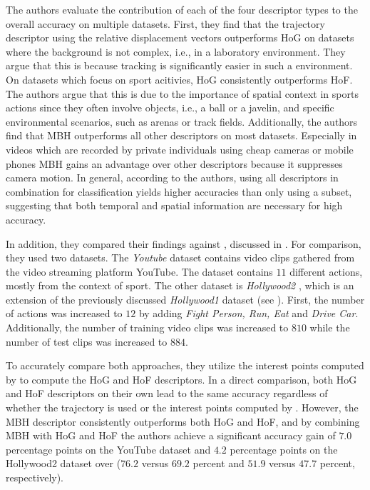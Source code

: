 The authors evaluate the contribution of each of the four descriptor types to the overall accuracy on multiple datasets.
First, they find that the trajectory descriptor using the relative displacement vectors outperforms HoG on datasets where the background is not complex, i.e., in a laboratory environment.
They argue that this is because tracking is significantly easier in such a environment.
On datasets which focus on sport acitivies, HoG consistently outperforms HoF.
The authors argue that this is due to the importance of spatial context in sports actions since they often involve objects, i.e., a ball or a javelin, and specific environmental scenarios, such as arenas or track fields.
Additionally, the authors find that MBH outperforms all other descriptors on most datasets.
Especially in videos which are recorded by private individuals using cheap cameras or mobile phones MBH gains an advantage over other descriptors because it suppresses camera motion.
In general, according to the authors, using all descriptors in combination for classification yields higher accuracies than only using a subset, suggesting that both temporal and spatial information are necessary for high accuracy.

In addition, they compared their findings against \cite{laptev_learning_2008}, discussed in .
For comparison, they used two datasets.
The \textit{Youtube} dataset \cite{liu_recognizing_2009} contains video clips gathered from the video streaming platform YouTube.
The dataset contains $11$ different actions, mostly from the context of sport.
The other dataset is \textit{Hollywood2} \cite{marszalek_actions_2009}, which is an extension of the previously discussed \textit{Hollywood1} dataset \cite{laptev_learning_2008} (see ).
First, the number of actions was increased to $12$ by adding \textit{Fight Person, Run, Eat} and \textit{Drive Car}.
Additionally, the number of training video clips was increased to $810$ while the number of test clips was increased to $884$. 

To accurately compare both approaches, they utilize the interest points computed by \cite{laptev_learning_2008} to compute the HoG and HoF descriptors.
In a direct comparison, both HoG and HoF descriptors on their own lead to the same accuracy regardless of whether the trajectory is used or the interest points computed by \cite{laptev_learning_2008}.
However, the MBH descriptor consistently outperforms both HoG and HoF, and by combining MBH with HoG and HoF the authors achieve a significant accuracy gain of $7.0$ percentage points on the YouTube dataset and $4.2$ percentage points on the Hollywood2 dataset over \cite{laptev_learning_2008} ($76.2$ versus $69.2$ percent and $51.9$ versus $47.7$ percent, respectively).

